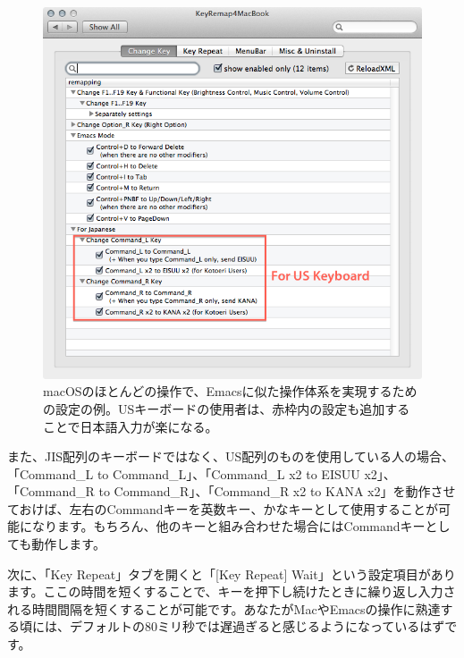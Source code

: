 \begin{figure}
  \centering
  \includegraphics[scale=0.35]{fig/KeyRemap4MacBook1.png}
  \caption{macOSのほとんどの操作で、Emacsに似た操作体系を実現するための設定の例。USキーボードの使用者は、赤枠内の設定も追加することで日本語入力が楽になる。}
  \label{fig:KeyRemap4MacBook1_png}
\end{figure}

また、JIS配列のキーボードではなく、US配列のものを使用している人の場合、「Command\_L to Command\_L」、「Command\_L x2 to EISUU x2」、「Command\_R to Command\_R」、「Command\_R x2 to KANA x2」を動作させておけば、左右のCommandキーを英数キー、かなキーとして使用することが可能になります。もちろん、他のキーと組み合わせた場合にはCommandキーとしても動作します。

次に、「Key Repeat」タブを開くと「[Key Repeat] Wait」という設定項目があります。ここの時間を短くすることで、キーを押下し続けたときに繰り返し入力される時間間隔を短くすることが可能です。あなたがMacやEmacsの操作に熟達する頃には、デフォルトの$80$ミリ秒では遅過ぎると感じるようになっているはずです。

